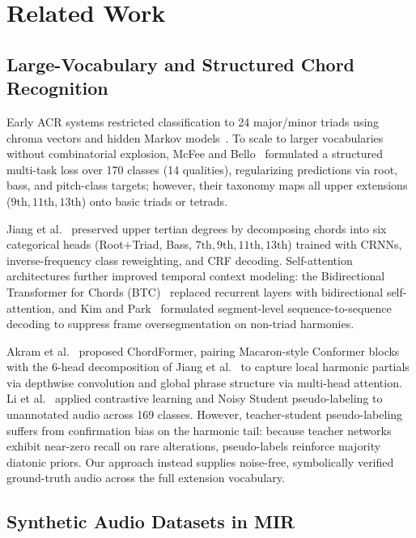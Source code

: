 \documentclass{article}
\begin{document}
\section{Related Work}\label{sec:related_work}

\subsection{Large-Vocabulary and Structured Chord Recognition}\label{subsec:rw_large_vocab}

Early ACR systems restricted classification to 24 major/minor triads using chroma vectors and hidden Markov models~\cite{pauwels2019twenty,korzeniowski2016feature}. To scale to larger vocabularies without combinatorial explosion, McFee and Bello~\cite{mcfee2017structured} formulated a structured multi-task loss over 170 classes (14 qualities), regularizing predictions via root, bass, and pitch-class targets; however, their taxonomy maps all upper extensions ($9\text{th}, 11\text{th}, 13\text{th}$) onto basic triads or tetrads.

Jiang et al.~\cite{jiang2019large} preserved upper tertian degrees by decomposing chords into six categorical heads (Root+Triad, Bass, $7\text{th}, 9\text{th}, 11\text{th}, 13\text{th}$) trained with CRNNs, inverse-frequency class reweighting, and CRF decoding. Self-attention architectures further improved temporal context modeling: the Bidirectional Transformer for Chords (BTC)~\cite{park2019btc} replaced recurrent layers with bidirectional self-attention, and Kim and Park~\cite{kim2026event} formulated segment-level sequence-to-sequence decoding to suppress frame oversegmentation on non-triad harmonies.

Akram et al.~\cite{akram2026chordformer} proposed ChordFormer, pairing Macaron-style Conformer blocks~\cite{gulati2020conformer} with the 6-head decomposition of Jiang et al.~\cite{jiang2019large} to capture local harmonic partials via depthwise convolution and global phrase structure via multi-head attention. Li et al.~\cite{li2025large} applied contrastive learning and Noisy Student pseudo-labeling to unannotated audio across 169 classes. However, teacher-student pseudo-labeling suffers from confirmation bias on the harmonic tail: because teacher networks exhibit near-zero recall on rare alterations, pseudo-labels reinforce majority diatonic priors. Our approach instead supplies noise-free, symbolically verified ground-truth audio across the full extension vocabulary.

\subsection{Synthetic Audio Datasets in MIR}\label{subsec:rw_synthetic_audio}
\end{document}

